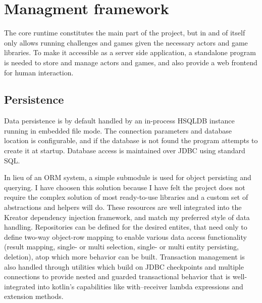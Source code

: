 





%

\chapter{Managment framework}\label{sect:Web}

The core runtime constitutes the main part of the project, but in and of itself only allows running challenges and games given the necessary actors and game libraries. To make it accessible as a server side application, a standalone program is needed to store and manage actors and games, and also provide a web frontend for human interaction.

	\section{Persistence}
	
	Data persistence is by default handled by an in-process HSQLDB instance running in embedded file mode. The connection parameters and database location is configurable, and if the database is not found the program attempts to create it at startup. Database access is maintained over JDBC using standard SQL.
		
	In lieu of an ORM system, a simple submodule is used for object persisting and querying. I have choosen this solution because I have felt the project does not require the complex solution of most ready-to-use libraries and a custom set of abstractions and helpers will do. These resources are well integrated into the Kreator dependency injection framework, and match my preferred style of data handling. Repositories can be defined for the desired entites, that need only to define two-way object-row mapping to enable various data access functionality (result mapping, single- or multi selection, single- or multi entity persisting, deletion), atop which more behavior can be built. Transaction management is also handled through utilities which build on JDBC checkpoints and multiple connections to provide nested and guarded transactional behavior that is well-integrated into kotlin's capabilities like with--receiver lambda expressions and extension methods.

